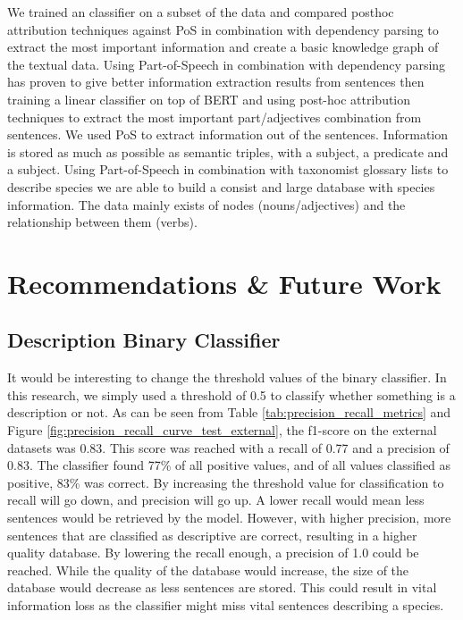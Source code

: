 \documentclass[a4paper, 12pt, oneside]{book} %
\begin{document}
We trained an classifier on a subset of the data and compared posthoc attribution techniques against PoS in combination with dependency parsing to extract the most important information and create a basic knowledge graph of the textual data.
Using Part-of-Speech in combination with dependency parsing has proven to give better information extraction results from sentences then training a linear classifier on top of BERT and using post-hoc attribution techniques to extract the most important part/adjectives combination from sentences.
We used PoS to extract information out of the sentences.
Information is stored as much as possible as semantic triples, with a subject, a predicate and a subject.
Using Part-of-Speech in combination with taxonomist glossary lists to describe species we are able to build a consist and large database with species information.
The data mainly exists of nodes (nouns/adjectives) and the relationship between them (verbs).


\newpage
\section{Recommendations \& Future Work} \label{par:future}
\subsection{Description Binary Classifier}
It would be interesting to change the threshold values of the binary classifier.
In this research, we simply used a threshold of 0.5 to classify whether something is a description or not.
As can be seen from Table \ref{tab:precision_recall_metrics} and Figure \ref{fig:precision_recall_curve_test_external}, the f1-score on the external datasets was 0.83. 
This score was reached with a recall of 0.77 and a precision of 0.83.
The classifier found 77\% of all positive values, and of all values classified as positive, 83\% was correct.
By increasing the threshold value for classification to recall will go down, and precision will go up.
A lower recall would mean less sentences would be retrieved by the model.
However, with higher precision, more sentences that are classified as descriptive are correct, resulting in a higher quality database.
By lowering the recall enough, a precision of 1.0 could be reached.
While the quality of the database would increase, the size of the database would decrease as less sentences are stored.
This could result in vital information loss as the classifier might miss vital sentences describing a species.
\end{document}
